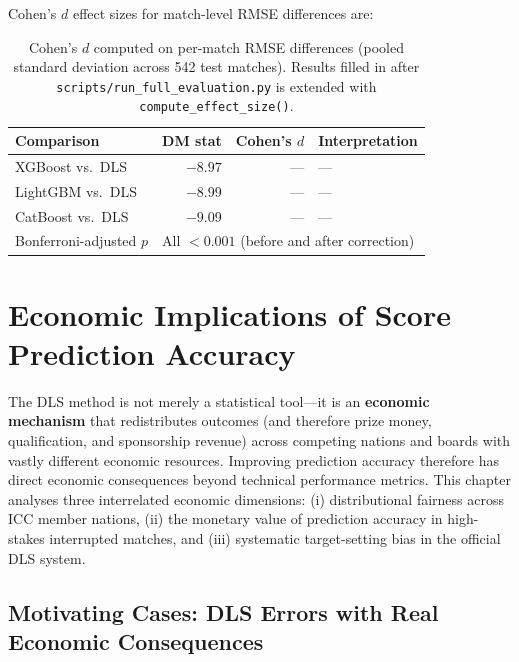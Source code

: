 \documentclass[12pt,a4paper,oneside]{report}
\begin{document}
Cohen's $d$ effect sizes for match-level RMSE differences are:

\begin{table}[htbp]
\centering
\caption[Cohen's $d$ effect sizes for DM tests]{Cohen's $d$ computed on per-match RMSE differences (pooled standard deviation across 542 test matches).  Results filled in after \texttt{scripts/run\_full\_evaluation.py} is extended with \texttt{compute\_effect\_size()}.}
\label{tab:effect_sizes}
\small
\begin{tabular}{lrrl}
\toprule
\textbf{Comparison} & \textbf{DM stat} & \textbf{Cohen's $d$} & \textbf{Interpretation} \\
\midrule
XGBoost vs.\ DLS  & $-8.97$ & --- & --- \\
LightGBM vs.\ DLS & $-8.99$ & --- & --- \\
CatBoost vs.\ DLS & $-9.09$ & --- & --- \\
Bonferroni-adjusted $p$ & \multicolumn{3}{l}{All $< 0.001$ (before and after correction)} \\
\bottomrule
\end{tabular}
\end{table}

\chapter{Economic Implications of Score Prediction Accuracy}
\label{ch:economics}

The DLS method is not merely a statistical tool---it is an \textbf{economic mechanism} that redistributes outcomes (and therefore prize money, qualification, and sponsorship revenue) across competing nations and boards with vastly different economic resources.  Improving prediction accuracy therefore has direct economic consequences beyond technical performance metrics.  This chapter analyses three interrelated economic dimensions: (i) distributional fairness across ICC member nations, (ii) the monetary value of prediction accuracy in high-stakes interrupted matches, and (iii) systematic target-setting bias in the official DLS system.

\section{Motivating Cases: DLS Errors with Real Economic Consequences}
\label{sec:econ_cases}
\end{document}
